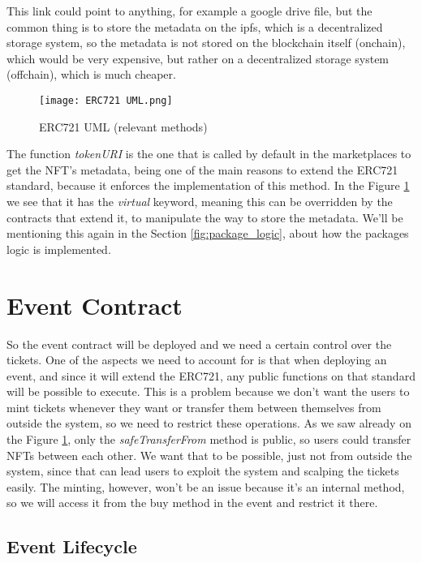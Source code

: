 This link could point to anything, for example a google drive file, but the
common thing is to store the metadata on the \gls{ipfs}, which is a
decentralized storage system, so the metadata is not stored on the blockchain
itself (onchain), which would be very expensive, but rather on a decentralized
storage system (offchain), which is much cheaper.

\begin{figure}[H]
	\texttt{[image: ERC721 UML.png]}
	\centering
	\caption{ERC721 UML (relevant methods)}
	\label{fig:erc721_uml}
\end{figure}

The function \textit{tokenURI} is the one that is called by default in the
marketplaces to get the NFT's metadata, being one of the main reasons to extend
the ERC721 standard, because it enforces the implementation of this method. In
the Figure \ref{fig:erc721_uml} we see that it has the \textit{virtual}
keyword, meaning this can be overridden by the contracts that extend it, to
manipulate the way to store the metadata. We'll be mentioning this again in the
Section \ref{fig:package_logic}, about how the packages logic is implemented.

\section{Event Contract}
\label{sec:event_contract}

So the event contract will be deployed and we need a certain control over the
tickets. One of the aspects we need to account for is that when deploying an
event, and since it will extend the ERC721, any public functions on that
standard will be possible to execute. This is a problem because we don't want
the users to mint tickets whenever they want or transfer them between
themselves from outside the system, so we need to restrict these operations. As
we saw already on the Figure \ref{fig:erc721_uml}, only the
\textit{safeTransferFrom} method is public, so users could transfer NFTs
between each other. We want that to be possible, just not from outside the
system, since that can lead users to exploit the system and scalping the
tickets easily. The minting, however, won't be an issue because it's an
internal method, so we will access it from the buy method in the event and
restrict it there.

\subsection{Event Lifecycle}
\label{subsec:event_lifecycle}

